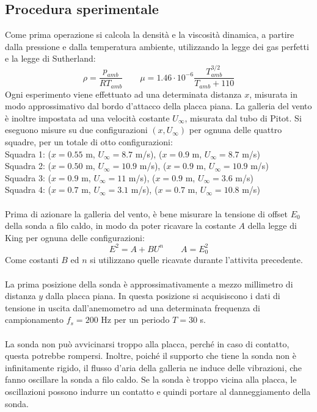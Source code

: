 \subsection{Procedura sperimentale}
Come prima operazione si calcola la densità e la viscosità dinamica, a partire dalla pressione e dalla temperatura ambiente, utilizzando la legge dei gas perfetti e la legge di Sutherland:
\begin{equation*}
    \rho = \frac{p_{amb}}{RT_{amb}} \qquad \mu = 1.46\cdot10^{-6} \frac{T_{amb}^{3/2}}{T_{amb}+110}
\end{equation*}
Ogni esperimento viene effettuato ad una determinata distanza $x$, misurata in modo approssimativo dal bordo d'attacco della placca piana. La galleria del vento è inoltre impostata ad una velocità costante $U_\infty$, misurata dal tubo di Pitot. Si eseguono misure su due configurazioni $(x,U_\infty)$ per ognuna delle quattro squadre, per un totale di otto configurazioni:\\
Squadra 1: ($x = 0.55$ m, $U_\infty= 8.7$ m/s), ($x = 0.9$ m, $U_\infty= 8.7$ m/s)\\
Squadra 2: ($x = 0.50$ m, $U_\infty= 10.9$ m/s), ($x = 0.9$ m, $U_\infty= 10.9$ m/s)\\
Squadra 3: ($x = 0.9$ m, $U_\infty= 11$ m/s), ($x = 0.9$ m, $U_\infty= 3.6$ m/s)\\
Squadra 4: ($x = 0.7$ m, $U_\infty= 3.1$ m/s), ($x = 0.7$ m, $U_\infty= 10.8$ m/s)\\\\
Prima di azionare la galleria del vento, è bene misurare la tensione di offset $E_0$ della sonda a filo caldo, in modo da poter ricavare la costante $A$ della legge di King per ognuna delle configurazioni:
\begin{equation*}
    E^2 = A + BU^n \qquad A = E_0^2
\end{equation*}
Come costanti $B$ ed $n$ si utilizzano quelle ricavate durante l'attivita precedente.\\\\
La prima posizione della sonda è approssimativamente a mezzo millimetro di distanza $y$ dalla placca piana. In questa posizione si acquisiscono i dati di tensione in uscita dall'anemometro ad una determinata frequenza di campionamento $f_s=200$ Hz per un periodo $T=30$ s.\\\\
La sonda non può avvicinarsi troppo alla placca, perché in caso di contatto, questa potrebbe rompersi. Inoltre, poiché il supporto che tiene la sonda non è infinitamente rigido, il flusso d'aria della galleria ne induce delle vibrazioni, che fanno oscillare la sonda a filo caldo. Se la sonda è troppo vicina alla placca, le oscillazioni possono indurre un contatto e quindi portare al danneggiamento della sonda.\\\\
